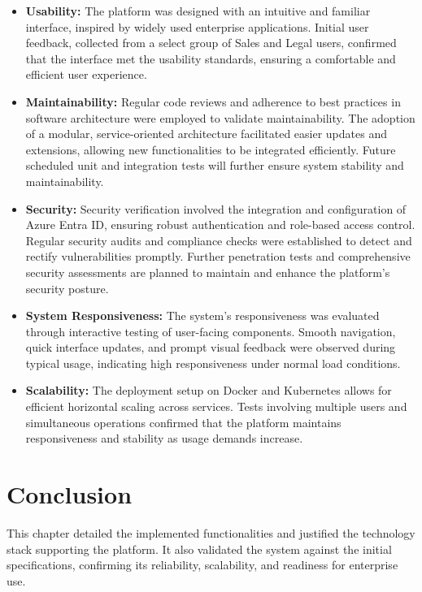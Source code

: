 \begin{itemize}
    \item \textbf{Usability:} The platform was designed with an intuitive and familiar interface, inspired by widely used enterprise applications. Initial user feedback, collected from a select group of Sales and Legal users, confirmed that the interface met the usability standards, ensuring a comfortable and efficient user experience.
    \item \textbf{Maintainability:} Regular code reviews and adherence to best practices in software architecture were employed to validate maintainability. The adoption of a modular, service-oriented architecture facilitated easier updates and extensions, allowing new functionalities to be integrated efficiently. Future scheduled unit and integration tests will further ensure system stability and maintainability.
    \item \textbf{Security:} Security verification involved the integration and configuration of Azure Entra ID, ensuring robust authentication and role-based access control. Regular security audits and compliance checks were established to detect and rectify vulnerabilities promptly. Further penetration tests and comprehensive security assessments are planned to maintain and enhance the platform's security posture.
    \item \textbf{System Responsiveness:} The system’s responsiveness was evaluated through interactive testing of user-facing components. Smooth navigation, quick interface updates, and prompt visual feedback were observed during typical usage, indicating high responsiveness under normal load conditions.
    \item \textbf{Scalability:} The deployment setup on Docker and Kubernetes allows for efficient horizontal scaling across services. Tests involving multiple users and simultaneous operations confirmed that the platform maintains responsiveness and stability as usage demands increase.
\end{itemize}

\section{Conclusion}
This chapter detailed the implemented functionalities and justified the technology stack supporting the platform. It also validated the system against the initial specifications, confirming its reliability, scalability, and readiness for enterprise use.
